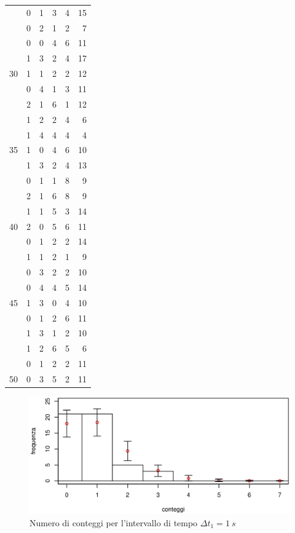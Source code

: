 \documentclass[10pt,oneside,a4paper]{article}
\begin{document}
\begin{center}
\begin{longtable}{rrrrrr}
   &   0 &   1 &   3 &   4 &  15 \\ 
   &   0 &   2 &   1 &   2 &   7 \\ 
   &   0 &   0 &   4 &   6 &  11 \\ 
   &   1 &   3 &   2 &   4 &  17 \\ 
  30 &   1 &   1 &   2 &   2 &  12 \\ 
   &   0 &   4 &   1 &   3 &  11 \\ 
   &   2 &   1 &   6 &   1 &  12 \\ 
   &   1 &   2 &   2 &   4 &   6 \\ 
   &   1 &   4 &   4 &   4 &   4 \\ 
  35 &   1 &   0 &   4 &   6 &  10 \\ 
   &   1 &   3 &   2 &   4 &  13 \\ 
   &   0 &   1 &   1 &   8 &   9 \\ 
   &   2 &   1 &   6 &   8 &   9 \\ 
   &   1 &   1 &   5 &   3 &  14 \\ 
  40 &   2 &   0 &   5 &   6 &  11 \\ 
   &   0 &   1 &   2 &   2 &  14 \\ 
   &   1 &   1 &   2 &   1 &   9 \\ 
  &   0 &   3 &   2 &   2 &  10 \\ 
   &   0 &   4 &   4 &   5 &  14 \\ 
  45 &   1 &   3 &   0 &   4 &  10 \\ 
   &   0 &   1 &   2 &   6 &  11 \\ 
   &   1 &   3 &   1 &   2 &  10 \\ 
   &   1 &   2 &   6 &   5 &   6 \\ 
   &   0 &   1 &   2 &   2 &  11 \\ 
  50 &   0 &   3 &   5 &   2 &  11 \\ 
   \hline
\end{longtable}
\end{center}

\begin{figure}[H]
\caption{Numero di conteggi per l'intervallo di tempo $\Delta t_1 = \SI{1}{s}$}
\label{fig:istogramma_deltat1}
\centering
\includegraphics[scale=0.7]{st_uno_nuovo.eps}
\end{figure}
\end{document}
